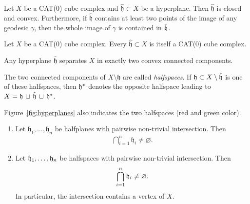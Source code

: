 \begin{prop}
  Let \(X\) be a CAT(0) cube complex and \(\mathfrak{\hat h} \subset X\) be a hyperplane. Then \(\mathfrak{\hat h}\) is closed and convex. Furthermore, if \(\mathfrak{\hat h}\) contains at least two points of the image of any geodesic \(\gamma\), then the whole image of \(\gamma\) is contained in \(\mathfrak{\hat h}\).
\end{prop}

\begin{cor}
  Let \(X\) be a CAT(0) cube complex. Every \(\mathfrak{\hat h} \subset X\) is itself a CAT(0) cube complex.
\end{cor}

\begin{thm}
  Any hyperplane \(\mathfrak{\hat h}\) separates \(X\) in exactly two convex connected components.
\end{thm}

\begin{defin}[Halfspaces]
  The two connected components of \(X \setminus \mathfrak{h}\) are called \emph{halfspaces}. If \(\mathfrak{h} \subset X \setminus \mathfrak{\hat h}\) is one of these halfspaces, then \(\mathfrak{h}^\ast\) denotes the opposite halfspace leading to \(X = \mathfrak{h}\, \sqcup\, \mathfrak{\hat h}\, \sqcup\, \mathfrak{h}^\ast \).
\end{defin}

\begin{bsp}
  Figure~\ref{fig:hyperplanes} also indicates the two halfspaces (red and green color).
\end{bsp}

\begin{thm}
  \label{thm:common-intersection}
  \begin{enumerate}
  \item Let \(\mathfrak{h}_1, \dots, \mathfrak{h}_n\) be halfplanes with pairwise non-trivial intersection. Then
    \begin{align*}
      \bigcap_{i=1}^n \mathfrak{h}_i \neq \varnothing.
    \end{align*}
  \item Let \(\mathfrak{h}_1, \dots, \mathfrak{h}_n\) be halfspaces with pairwise non-trivial intersection. Then
    \begin{align*}
      \bigcap_{i=1}^n \mathfrak{h}_i \neq \varnothing.
    \end{align*}
    In particular, the intersection contains a vertex of \(X\).
  \end{enumerate}
\end{thm}

